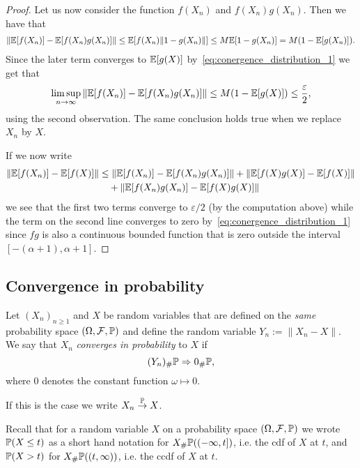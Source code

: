\begin{proof}
Let us now consider the function $f(X_n)$ and $f(X_n)g(X_n)$. Then we have that
\begin{align*}
	\|\mathbb E[f(X_n)] - \mathbb E[f(X_n)g(X_n)]\| \le \mathbb E[f(X_n)\|1 - g(X_n)\|] 
	\le M \mathbb E[1 - g(X_n)] = M(1-\mathbb E[g(X_n)]).
\end{align*}
Since the later term converges to $\mathbb E[g(X)]$ by~\eqref{eq:conergence_distribution_1} we get that
\[
	\limsup_{n \to \infty} \|\mathbb E[f(X_n)] - \mathbb E[f(X_n)g(X_n)]\| \le M(1-\mathbb E[g(X)])
	\le \frac{\varepsilon}{2},
\]
using the second observation. The same conclusion holds true when we replace $X_n$ by $X$.

If we now write
\begin{align*}
	\|\mathbb E[f(X_n)] - \mathbb E[f(X)]\| &\le \|\mathbb E[f(X_n)] - \mathbb E[f(X_n)g(X_n)]\| + \|\mathbb E[f(X)g(X)] - \mathbb E[f(X)]\| \\
		&\hspace{10pt}+ \|\mathbb E[f(X_n)g(X_n)] - \mathbb E[f(X)g(X)]\|
\end{align*}
we see that the first two terms converge to $\varepsilon/2$ (by the computation above) while the term on the second line converges to zero by~\eqref{eq:conergence_distribution_1} since $fg$ is also a continuous bounded function that is zero outside the interval $[-(\alpha+1),\alpha+1]$. 
\end{proof}



\subsection{Convergence in probability}

\begin{definition}
Let $(X_n)_{n \ge 1}$ and $X$ be random variables that are defined on the \emph{same} probability space $(\Omega, \mathcal F, \mathbb P)$ and define the random variable $Y_n := \|X_n - X\|$. We say that $X_n$ \emph{converges in probability} to $X$ if
\[
	(Y_n)_\# \mathbb P \Rightarrow 0_\# \mathbb P,
\] 
where $0$ denotes the constant function $\omega \mapsto 0$.

If this is the case we write $X_n \stackrel{\mathbb P}{\rightarrow} X$.
\end{definition}

Recall that for a random variable $X$ on a probability space $(\Omega, \mathcal F, \mathbb P)$ we wrote $\mathbb P(X \le t)$ as a short hand notation for $X_\# \mathbb P ((-\infty,t])$, i.e. the cdf of $X$ at $t$, and $\mathbb P(X > t)$ for $X_\# \mathbb P ((t,\infty))$, i.e. the ccdf of $X$ at $t$.

